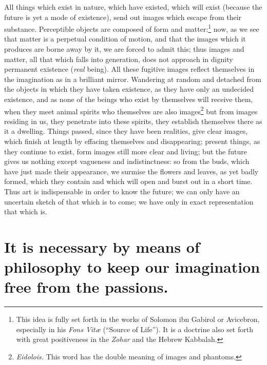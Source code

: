 \documentclass[12pt]{article}
\begin{document}
All things which exist in nature, which have existed, which will exist (because
the future is yet a mode of existence), send out images which escape from their
substance. Perceptible objects are composed of form and matter:\footnote{This
idea is fully set forth in the works of Solomon ibn Gabirol or Avicebron,
especially in his \textit{Fons Vit{\ae}} (``Source of Life''). It is a doctrine
also set forth with great positiveness in the \textit{Zohar} and the Hebrew
Kabbalah.} now, as we see that matter is a perpetual condition of motion, and
that the images which it produces are borne away by it, we are forced to admit
this; thus images and matter, all that which falls into generation, does not
approach in dignity permanent existence (\textit{real} being). All these
fugitive images reflect themselves in the imagination as in a brilliant mirror.
Wandering at random and detached from the objects in which they have taken
existence, as they have only an undecided existence, and as none of the beings
who exist by themselves will receive them, when they meet animal spirits who
themselves are also images\footnote{\textit{Eidolois.} This word has the double
meaning of images and phantoms.} but from images residing in us, they penetrate
into these spirits, they establish themselves there as it a dwelling. Things
passed, since they have been realities, give clear images, which finish at
length by effacing themselves and disappearing; present things, as they
continue to exist, form images still more clear and living; but the future
gives us nothing except vagueness and indistinctness: so from the buds, which
have just made their appearance, we surmise the flowers and leaves, as yet
badly formed, which they contain and which will open and burst out in a short
time. Thus art is indispensable in order to know the future; we can only have
an uncertain sketch of that which is to come; we have only in exact
representation that which is.


\section{It is necessary by means of philosophy to keep our imagination free
from the passions.}
\end{document}
